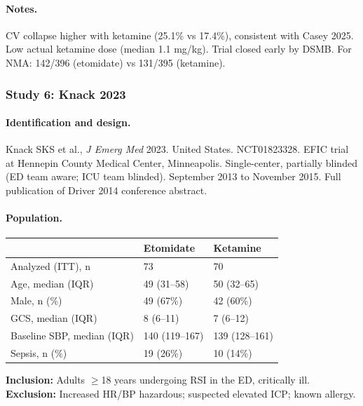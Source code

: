 \documentclass[11pt]{article}
\begin{document}
\paragraph{Notes.}
CV collapse higher with ketamine (25.1\% vs 17.4\%), consistent with Casey 2025. Low actual ketamine dose (median 1.1 mg/kg). Trial closed early by DSMB. For NMA: 142/396 (etomidate) vs 131/395 (ketamine).

\bigskip

\subsubsection{Study 6: Knack 2023}

\paragraph{Identification and design.}
Knack SKS et al., \textit{J Emerg Med} 2023. United States. NCT01823328. EFIC trial at Hennepin County Medical Center, Minneapolis. Single-center, partially blinded (ED team aware; ICU team blinded). September 2013 to November 2015. Full publication of Driver 2014 conference abstract.

\paragraph{Population.}

\begin{table}[H]
\centering\footnotesize
\begin{tabularx}{\textwidth}{L{4cm} C{3cm} C{3cm}}
\toprule
& \textbf{Etomidate} & \textbf{Ketamine} \\
\midrule
Analyzed (ITT), n & 73 & 70 \\
Age, median (IQR) & 49 (31--58) & 50 (32--65) \\
Male, n (\%) & 49 (67\%) & 42 (60\%) \\
GCS, median (IQR) & 8 (6--11) & 7 (6--12) \\
Baseline SBP, median (IQR) & 140 (119--167) & 139 (128--161) \\
Sepsis, n (\%) & 19 (26\%) & 10 (14\%) \\
\bottomrule
\end{tabularx}
\end{table}

\noindent\textbf{Inclusion:} Adults $\geq$18 years undergoing RSI in the ED, critically ill.\\
\textbf{Exclusion:} Increased HR/BP hazardous; suspected elevated ICP; known allergy.
\end{document}
